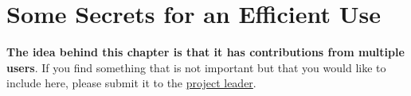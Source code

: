 
\hypertarget{secrets}{}
\chapter{Some Secrets for an Efficient Use}

\textbf{The idea behind this chapter is that it has contributions from multiple users}.
If you find something that is not important but that you would like to include here,
please submit it to the \href{mailto:joseclaudio.faria@gmail.com}{project leader}.

\newpage

\newpage

\newpage

\newpage

\newpage

\newpage

\newpage

\newpage

\newpage

\newpage

\newpage

